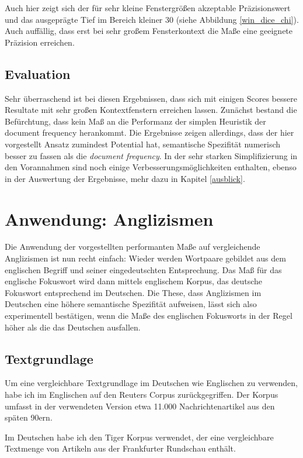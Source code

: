 \documentclass[11pt,numbers=noenddot]{scrartcl}
\begin{document}
Auch hier zeigt sich der für sehr kleine Fenstergrößen akzeptable Präzisionswert und das ausgeprägte Tief im Bereich kleiner 30 (siehe Abbildung \ref{win_dice_chi}). Auch auffällig, dass erst bei sehr großem Fensterkontext die Maße eine geeignete Präzision erreichen.


\subsection{Evaluation}

Sehr überraschend ist bei diesen Ergebnissen, dass sich mit einigen Scores bessere Resultate mit sehr großen Kontextfenstern erreichen lassen. Zunächst bestand die Befürchtung, dass kein Maß an die Performanz der simplen Heuristik der document frequency herankommt. Die Ergebnisse zeigen allerdings, dass der hier vorgestellt Ansatz zumindest Potential hat, semantische Spezifität numerisch besser zu fassen als die \emph{document frequency}. In der sehr starken Simplifizierung in den Vorannahmen sind noch einige Verbesserungsmöglichkeiten enthalten, ebenso in der Auswertung der Ergebnisse, mehr dazu in Kapitel \ref{ausblick}.

\section{Anwendung: Anglizismen}

Die Anwendung der vorgestellten performanten Maße auf vergleichende Anglizismen ist nun recht einfach: Wieder werden Wortpaare gebildet aus dem englischen Begriff und seiner eingedeutschten Entsprechung. Das Maß für das englische Fokuswort wird dann mittels englischem Korpus, das deutsche Fokuswort entsprechend im Deutschen. Die These, dass Anglizismen im Deutschen eine höhere semantische Spezifität aufweisen, lässt sich also experimentell bestätigen, wenn die Maße des englischen Fokusworts in der Regel höher als die das Deutschen ausfallen.

\subsection{Textgrundlage}

Um eine vergleichbare Textgrundlage im Deutschen wie Englischen zu verwenden, habe ich im Englischen auf den Reuters Corpus \citep{Lewis:2004:RNB:1005332.1005345} zurückgegriffen. Der Korpus umfasst in der verwendeten Version etwa 11.000 Nachrichtenartikel aus den späten 90ern.

Im Deutschen habe ich den Tiger Korpus \citep{Brants2004} verwendet, der eine vergleichbare Textmenge von Artikeln aus der Frankfurter Rundschau enthält.
\end{document}
